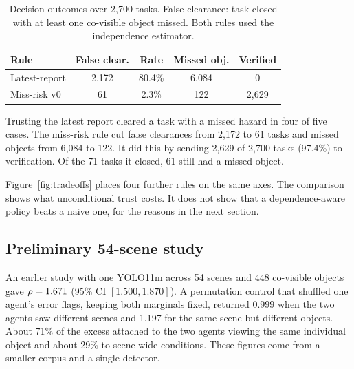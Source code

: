 \begin{table}[t]
\centering
\caption{Decision outcomes over 2{,}700 tasks. False clearance: task closed
with at least one co-visible object missed. Both rules used the independence
estimator.}
\label{tab:policy}
\small
\setlength{\tabcolsep}{3pt}
\begin{tabular}{@{}lcccc@{}}
\toprule
Rule & False clear. & Rate & Missed obj. & Verified \\
\midrule
Latest-report & 2{,}172 & 80.4\% & 6{,}084 & 0 \\
Miss-risk v0  & 61      & 2.3\%  & 122     & 2{,}629 \\
\bottomrule
\end{tabular}
\end{table}

Trusting the latest report cleared a task with a missed hazard in four of
five cases. The miss-risk rule cut false clearances from 2{,}172 to 61 tasks
and missed objects from 6{,}084 to 122. It did this by sending 2{,}629 of
2{,}700 tasks (97.4\%) to verification. Of the 71 tasks it closed, 61 still
had a missed object.

Figure~\ref{fig:tradeoffs} places four further rules on the same axes.
The comparison shows what unconditional trust costs. It does not show that a
dependence-aware policy beats a naive one, for the reasons in the next
section.

\subsection{Preliminary 54-scene study}
An earlier study with one YOLO11m across 54 scenes and 448 co-visible objects
gave $\rho=1.671$ (95\% CI $[1.500,1.870]$). A permutation control that
shuffled one agent's error flags, keeping both marginals fixed, returned
0.999 when the two agents saw different scenes and 1.197 for the same scene
but different objects. About 71\% of the excess attached to the two agents
viewing the same individual object and about 29\% to scene-wide conditions.
These figures come from a smaller corpus and a single detector.
